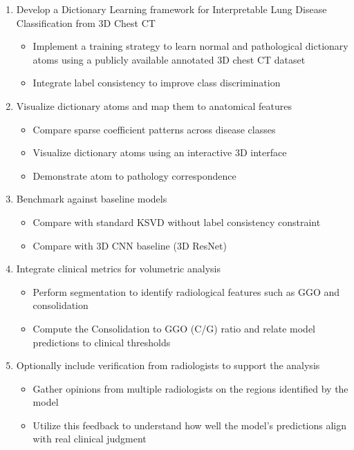 \begin{enumerate}
    \item Develop a Dictionary Learning framework for Interpretable Lung Disease Classification from 3D Chest CT
        \begin{itemize}
            \item Implement a training strategy to learn normal and pathological dictionary atoms
            using a publicly available annotated 3D chest CT dataset
            \item Integrate label consistency to improve class discrimination
        \end{itemize}
    \item Visualize dictionary atoms and map them to anatomical features
        \begin{itemize}
            \item Compare sparse coefficient patterns across disease classes
            \item Visualize dictionary atoms using an interactive 3D interface
            \item Demonstrate atom to pathology correspondence
        \end{itemize}
    \item Benchmark against baseline models
        \begin{itemize}
            \item Compare with standard \ac{KSVD} without label consistency constraint
            \item Compare with 3D \ac{CNN} baseline (3D ResNet)
        \end{itemize}
    \item Integrate clinical metrics for volumetric analysis
        \begin{itemize}
            \item Perform segmentation to identify radiological features such as GGO and consolidation
            \item Compute the Consolidation to GGO (C/G) ratio and relate model predictions to clinical thresholds
        \end{itemize}
    
    \item Optionally include verification from radiologists to support the analysis
        \begin{itemize}
            \item Gather opinions from multiple radiologists on the regions identified by the model
            \item Utilize this feedback to understand how well the model's predictions align with real clinical judgment
        \end{itemize}

\end{enumerate}

